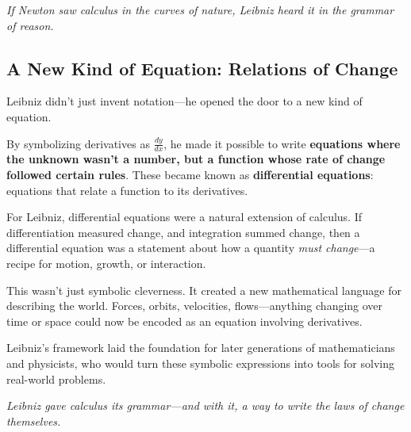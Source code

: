 \vspace{1em}

\begin{center}
\textit{If Newton saw calculus in the curves of nature, Leibniz heard it in the grammar of reason.}
\end{center}


\subsection{A New Kind of Equation: Relations of Change}

Leibniz didn’t just invent notation—he opened the door to a new kind of equation.

By symbolizing derivatives as \( \frac{dy}{dx} \), he made it possible to write \textbf{equations where the unknown wasn’t a number, but a function whose rate of change followed certain rules}. These became known as \textbf{differential equations}: equations that relate a function to its derivatives.

For Leibniz, differential equations were a natural extension of calculus. If differentiation measured change, and integration summed change, then a differential equation was a statement about how a quantity \emph{must change}—a recipe for motion, growth, or interaction.

This wasn’t just symbolic cleverness. It created a new mathematical language for describing the world. Forces, orbits, velocities, flows—anything changing over time or space could now be encoded as an equation involving derivatives.

Leibniz’s framework laid the foundation for later generations of mathematicians and physicists, who would turn these symbolic expressions into tools for solving real-world problems.

\vspace{1em}

\begin{center}
\textit{Leibniz gave calculus its grammar—and with it, a way to write the laws of change themselves.}
\end{center}